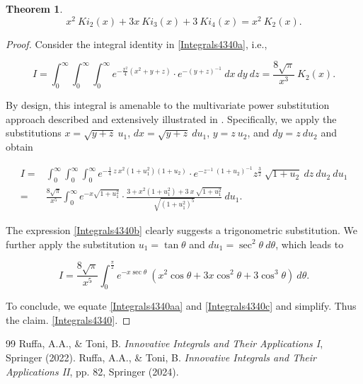 \documentclass[10pt,a4paper]{amsart}
\newtheorem{theorem}{Theorem}%
\begin{document}
\begin{theorem}

\begin{equation}
x^2\:Ki_2(x) + 3x\:Ki_3(x) + 3\:Ki_4(x) = x^2\:K_2(x).
\label{Integrals4340}
\end{equation}
    
\end{theorem}

\begin{proof}
Consider the integral identity in \eqref{Integrals4340a}, i.e.,

\begin{equation}
I
=
\int_0^\infty
\int_0^\infty
\int_0^\infty
e^{
-\frac{x^2}{4}
(x^2+y+z)
}\cdot
e^{-(y+z)^{-1}}\:
dx\:dy\:dz
=
\frac{8\sqrt{\pi}}{x^3}\:
K_2(x).
\label{Integrals4340aa}
\end{equation}

By design, this integral is amenable to the multivariate power substitution approach described and extensively illustrated in \cite{ Ruffa2022,Ruffa2024}. Specifically, we apply the substitutions $x=\sqrt{y+z}\:u_1$, $dx=\sqrt{y+z}\: du_1$, $y=z\:u_2$, and $dy=z\: du_2$ and obtain

\begin{equation}
\begin{split}
I = & \int_0^\infty \int_0^\infty \int_0^\infty e^{-\frac{1}{4}\:z\:x^2(1+u_1^2)(1+u_2)}\cdot
e^{-z^{-1}\:(1+u_2)^{-1} } z^{\frac{3}{2}}\: \sqrt{1+u_2}\: dz\:du_2\:du_1\\
= & \frac{8\sqrt{\pi}}{x^5}
\int_0^\infty
e^{-x\sqrt{1+u_1^2}}\cdot
\frac{ 3+x^2(1+u_1^2)+3\:x\:\sqrt{1+u_1^2}}{\sqrt{(1+u_1^2)^5}}\:du_1.
\label{Integrals4340b}
\end{split}
\end{equation}

The expression \eqref{Integrals4340b} clearly suggests a trigonometric substitution. We further apply the substitution $u_1=\tan\theta$ and $du_1=\sec^2\theta\:d\theta$, which leads to 

\begin{equation}
I
=
\frac{8\sqrt{\pi}}{x^5}
\int_0^\frac{\pi}{2}
e^{-x\sec\theta}\:
(x^2\cos\theta+3x\cos^2\theta+3\cos^3\theta)\:
d\theta.
\label{Integrals4340c}
\end{equation}

To conclude, we equate \eqref{Integrals4340aa} and \eqref{Integrals4340c} and simplify. Thus the claim. \eqref{Integrals4340}.
\end{proof}


\begin{thebibliography}{99}
 Ruffa, A.A., \& Toni, B. \emph{Innovative Integrals and Their Applications I}, Springer (2022).
 Ruffa, A.A., \& Toni, B. \emph{Innovative Integrals and Their Applications II}, pp. 82, Springer (2024).
\end{thebibliography}
\end{document}
